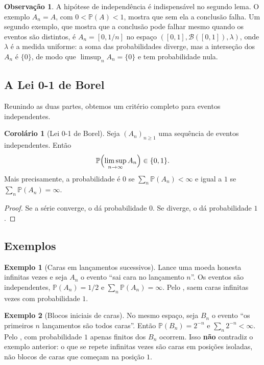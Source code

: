 \documentclass[12pt,portuguese]{article}
\theoremstyle{definition}
\newtheorem{example}[example]{Exemplo}
\newtheorem{corollary}[corollary]{Corolário}
\newtheorem{remark}[remark]{Observação}
\theoremstyle{plainexercise}
\theoremstyle{starredexercise}
\theoremstyle{definition}
\begin{document}
\begin{remark}\label{rem:bc2-independencia}
A hipótese de independência é indispensável no segundo lema. O exemplo
$A_n=A$, com $0<\mathbb{P}(A)<1$, mostra que sem ela a conclusão falha. Um
segundo exemplo, que mostra que a conclusão pode falhar mesmo quando os eventos
são distintos, é $A_n=[0,1/n]$ no espaço $([0,1],\mathcal{B}([0,1]),\lambda)$,
onde $\lambda$ é a medida uniforme: a soma das probabilidades diverge, mas a
interseção dos $A_n$ é $\{0\}$, de modo que $\limsup_n A_n=\{0\}$ e tem
probabilidade nula.
\end{remark}

\subsection{A Lei 0-1 de Borel}\label{subsec:lei-01}

Reunindo as duas partes, obtemos um critério completo para eventos
independentes.

\begin{corollary}[Lei 0-1 de Borel]\label{cor:lei-01}
Seja $(A_n)_{n\geqslant1}$ uma sequência de eventos independentes. Então
\[
\mathbb{P}\Bigl(\limsup_{n\to\infty}A_n\Bigr)\in\{0,1\}.
\]
Mais precisamente, a probabilidade é $0$ se $\sum_n\mathbb{P}(A_n)<\infty$ e
igual a $1$ se $\sum_n\mathbb{P}(A_n)=\infty$.
\end{corollary}

\begin{proof}
Se a série converge, o  dá probabilidade $0$. Se diverge, o
 dá probabilidade $1$.
\end{proof}

\subsection{Exemplos}\label{subsec:bc-exemplos}

\begin{example}[Caras em lançamentos sucessivos]\label{ex:caras-infinitas}
Lance uma moeda honesta infinitas vezes e seja $A_n$ o evento ``sai cara no
lançamento $n$''. Os eventos são independentes, $\mathbb{P}(A_n)=1/2$ e
$\sum_n\mathbb{P}(A_n)=\infty$. Pelo , saem caras infinitas vezes
com probabilidade $1$.
\end{example}

\begin{example}[Blocos iniciais de caras]\label{ex:blocos-iniciais}
No mesmo espaço, seja $B_n$ o evento ``os primeiros $n$ lançamentos são todos
caras''. Então $\mathbb{P}(B_n)=2^{-n}$ e $\sum_n2^{-n}<\infty$. Pelo
, com probabilidade $1$ apenas finitos dos $B_n$ ocorrem. Isso
\textbf{não} contradiz o exemplo anterior: o que se repete infinitas vezes são caras em
posições isoladas, não blocos de caras que começam na posição $1$.
\end{example}
\end{document}
